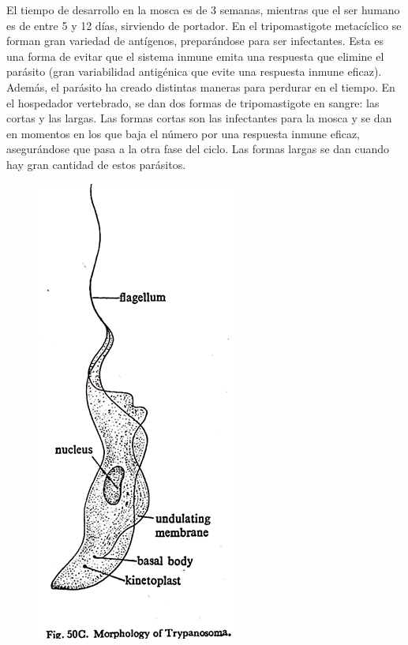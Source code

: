 El tiempo de desarrollo en la mosca es de 3 semanas, mientras que el ser humano es de entre 5 y 12 días, sirviendo de portador. En el tripomastigote metacíclico se forman gran variedad de antígenos, preparándose para ser infectantes. Esta es una forma de evitar que el sistema inmune emita una respuesta que elimine el parásito (gran variabilidad antigénica que evite una respuesta inmune eficaz). Además, el parásito ha creado distintas maneras para perdurar en el tiempo. En el hospedador vertebrado, se dan dos formas de tripomastigote en sangre: las cortas y las largas. Las formas cortas son las infectantes para la mosca y se dan en  momentos en los que baja el número por una respuesta inmune eficaz, asegurándose que pasa a la otra fase del ciclo. Las formas largas se dan cuando hay gran cantidad de estos parásitos.
\begin{figure}[H]
	\centering
	\includegraphics[width=0.8\columnwidth]{A.imagenes/ACV-BioSan-Parasit-TbruceiMorf2}

\end{figure}
